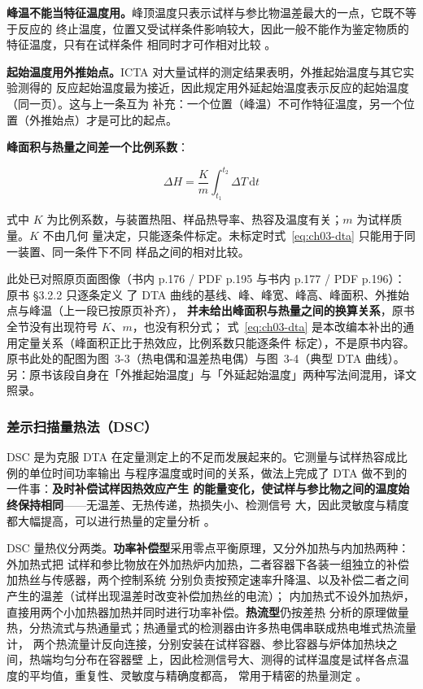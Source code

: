 \textbf{峰温不能当特征温度用。}峰顶温度只表示试样与参比物温差最大的一点，它既不等于反应的
终止温度，位置又受试样条件影响较大，因此一般不能作为鉴定物质的特征温度，只有在试样条件
相同时才可作相对比较 。

\textbf{起始温度用外推始点。}ICTA 对大量试样的测定结果表明，外推起始温度与其它实验测得的
反应起始温度最为接近，因此规定用外延起始温度表示反应的起始温度（同一页）。这与上一条互为
补充：一个位置（峰温）不可作特征温度，另一个位置（外推始点）才是可比的起点。

\textbf{峰面积与热量之间差一个比例系数}：

\begin{equation}\label{eq:ch03-dta}
\Delta H=\frac{K}{m}\int_{t_1}^{t_2}\Delta T\,\mathrm{d}t
\end{equation}

式中 $K$ 为比例系数，与装置热阻、样品热导率、热容及温度有关；$m$ 为试样质量。$K$ 不由几何
量决定，只能逐条件标定。未标定时式~\eqref{eq:ch03-dta} 只能用于同一装置、同一条件下不同
样品之间的相对比较。

此处已对照原页面图像（书内 p.176 / PDF p.195 与书内 p.177 / PDF p.196）：原书 §3.2.2 只逐条定义
了 DTA 曲线的基线、峰、峰宽、峰高、峰面积、外推始点与峰温（上一段已按原页补齐），
\textbf{并未给出峰面积与热量之间的换算关系}，原书全节没有出现符号 $K$、$m$，也没有积分式；
式~\eqref{eq:ch03-dta} 是本改编本补出的通用定量关系（峰面积正比于热效应，比例系数只能逐条件
标定），不是原书内容。原书此处的配图为图~3-3（热电偶和温差热电偶）与图~3-4（典型 DTA
曲线）。另：原书该段自身在「外推起始温度」与「外延起始温度」两种写法间混用，译文照录。

\subsubsection{差示扫描量热法（DSC）}

DSC 是为克服 DTA 在定量测定上的不足而发展起来的。它测量与试样热容成比例的单位时间功率输出
与程序温度或时间的关系，做法上完成了 DTA 做不到的一件事：\textbf{及时补偿试样因热效应产生
的能量变化，使试样与参比物之间的温度始终保持相同}——无温差、无热传递，热损失小、检测信号
大，因此灵敏度与精度都大幅提高，可以进行热量的定量分析
。

DSC 量热仪分两类。\textbf{功率补偿型}采用零点平衡原理，又分外加热与内加热两种：外加热式把
试样和参比物放在外加热炉内加热，二者容器下各装一组独立的补偿加热丝与传感器，两个控制系统
分别负责按预定速率升降温、以及补偿二者之间产生的温差（试样出现温差时改变补偿加热丝的电流）；
内加热式不设外加热炉，直接用两个小加热器加热并同时进行功率补偿。\textbf{热流型}仍按差热
分析的原理做量热，分热流式与热通量式；热通量式的检测器由许多热电偶串联成热电堆式热流量计，
两个热流量计反向连接，分别安装在试样容器、参比容器与炉体加热块之间，热端均匀分布在容器壁
上，因此检测信号大、测得的试样温度是试样各点温度的平均值，重复性、灵敏度与精确度都高，
常用于精密的热量测定 。

